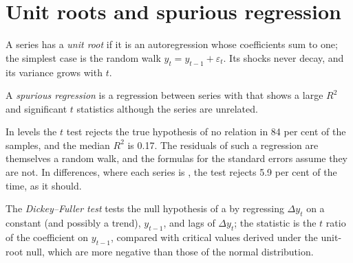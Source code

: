 \section{Unit roots and spurious regression}\label{sec:b2:time-series:unit-roots}

\begin{definition}\label{def:b2:time-series:unit-root}
A series has a \emph{unit root} if it is an autoregression whose coefficients sum to one; the simplest
case is the random walk $y_t = y_{t-1} + \varepsilon_t$. Its shocks never decay, and its variance grows with $t$.
\end{definition}

\begin{definition}\label{def:b2:time-series:spurious}
A \emph{spurious regression} is a regression between series with  that shows a large
$R^2$ and significant $t$ statistics although the series are unrelated.
\end{definition}

\label{lst:b2:time-series:random-walks}

\label{out:b2:time-series:random-walks}

In levels the $t$ test rejects the true hypothesis of no relation in 84 per cent of the samples, and the median $R^2$ is
0.17. The residuals of such a regression are themselves a random walk, and the formulas for the standard errors assume
they are not. In differences, where each series is , the test rejects 5.9 per cent of the time, as it should.

\begin{definition}\label{def:b2:time-series:dickey-fuller}
The \emph{Dickey--Fuller test} tests the null hypothesis of a  by regressing $\Delta y_t$
on a constant (and possibly a trend), $y_{t-1}$, and lags of $\Delta y_t$; the statistic is the $t$ ratio of the coefficient
on $y_{t-1}$, compared with critical values derived under the unit-root null, which are more negative than those of the
normal distribution.
\end{definition}

